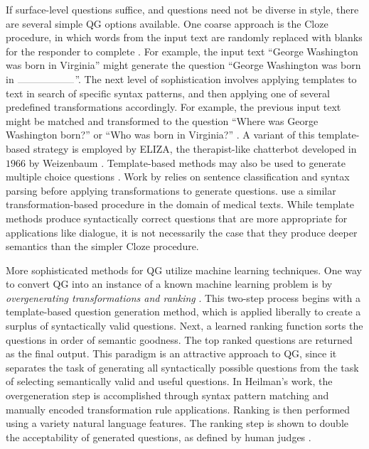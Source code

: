 If surface-level questions suffice, and questions need not be diverse in style, there are several simple QG options available. One coarse approach is the Cloze procedure, in which words from the input text are randomly replaced with blanks for the responder to complete \citep{taylor1953cloze}. For example, the input text ``George Washington was born in Virginia'' might generate the question ``George Washington was born in $\rule{2cm}{0.05mm}$''. The next level of sophistication involves applying templates to text in search of specific syntax patterns, and then applying one of several predefined transformations accordingly. For example, the previous input text might be matched and transformed to the question ``Where was George Washington born?'' or ``Who was born in Virginia?'' \citep{gates2008automatically, kunichika2004automated, heilman2011automatic}. A variant of this template-based strategy is employed by ELIZA, the therapist-like chatterbot developed in $1966$ by Weizenbaum \citep{weizenbaum1966eliza}. Template-based methods may also be used to generate multiple choice questions \citep{mitkov2006computer}. Work by \citet{ali2010automatic} relies on sentence classification and syntax parsing before applying transformations to generate questions.  \citet{wang2007automatic} use a similar transformation-based procedure in the domain of medical texts. While template methods produce syntactically correct questions that are more appropriate for applications like dialogue, it is not necessarily the case that they produce deeper semantics than the simpler Cloze procedure.

More sophisticated methods for QG utilize machine learning techniques. One way to convert QG into an instance of a known machine learning problem is by \textit{overgenerating transformations and ranking} \citep{heilman2010extracting, heilman2010good, heilman2011automatic, mannem2010question}. This two-step process begins with a template-based question generation method, which is applied liberally to create a surplus of syntactically valid questions. Next, a learned ranking function sorts the questions in order of semantic goodness. The top ranked questions are returned as the final output. This paradigm is an attractive approach to QG, since it separates the task of generating all syntactically possible questions from the task of selecting semantically valid and useful questions. In Heilman's work, the overgeneration step is accomplished through syntax pattern matching and manually encoded transformation rule applications. Ranking is then performed using a variety natural language features. The ranking step is shown to double the acceptability of generated questions, as defined by human judges \citep{heilman2011automatic}. 

